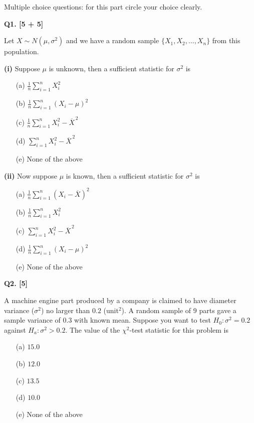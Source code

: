 \documentclass[11pt]{article}
\begin{document}
\begingroup
\small
\setlength{\parskip}{0.05em}
Multiple choice questions: for this part circle your choice clearly.

\textbf{Q1. [5 + 5]}

Let $X\sim N(\mu,\sigma^2)$ and we have a random sample $\{X_1,X_2,\ldots,X_n\}$ from this population.

\textbf{(i)} Suppose $\mu$ is unknown, then a sufficient statistic for $\sigma^2$ is
\begin{enumerate}
\setlength{\itemsep}{0pt}\setlength{\parsep}{0pt}\setlength{\topsep}{2pt}
\item[(a)] $\frac{1}{n}\sum_{i=1}^n X_i^2$
\item[(b)] $\frac{1}{n}\sum_{i=1}^n (X_i-\mu)^2$
\item[(c)] $\frac{1}{n}\sum_{i=1}^n X_i^2-\overline{X}^{\,2}$
\item[(d)] $\sum_{i=1}^n X_i^2-\overline{X}^{\,2}$
\item[(e)] None of the above
\end{enumerate}

\textbf{(ii)} Now suppose $\mu$ is known, then a sufficient statistic for $\sigma^2$ is
\begin{enumerate}
\setlength{\itemsep}{0pt}\setlength{\parsep}{0pt}\setlength{\topsep}{2pt}
\item[(a)] $\frac{1}{n}\sum_{i=1}^n (X_i-\overline{X})^2$
\item[(b)] $\frac{1}{n}\sum_{i=1}^n X_i^2$
\item[(c)] $\sum_{i=1}^n X_i^2-\overline{X}^{\,2}$
\item[(d)] $\frac{1}{n}\sum_{i=1}^n (X_i-\mu)^2$
\item[(e)] None of the above
\end{enumerate}

\medskip

\textbf{Q2. [5]}

A machine engine part produced by a company is claimed to have diameter variance ($\sigma^2$) no larger than $0.2$ (unit$^2$). A random sample of 9 parts gave a sample variance of $0.3$ with known mean. Suppose you want to test $H_0:\sigma^2=0.2$ against $H_a:\sigma^2>0.2$. The value of the $\chi^2$-test statistic for this problem is
\begin{enumerate}
\setlength{\itemsep}{0pt}\setlength{\parsep}{0pt}\setlength{\topsep}{2pt}
\item[(a)] $15.0$
\item[(b)] $12.0$
\item[(c)] $13.5$
\item[(d)] $10.0$
\item[(e)] None of the above
\end{enumerate}
\end{document}
